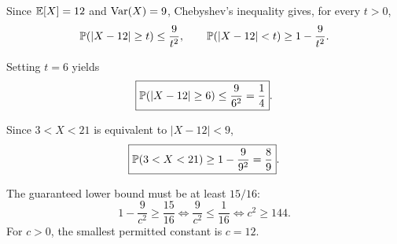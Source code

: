 \documentclass[11pt,oneside]{article}
\begin{document}
\begin{solution}
Since $\mathbb{E}[X]=12$ and $\operatorname{Var}(X)=9$, Chebyshev's inequality gives, for every $t>0$,
\[
\mathbb{P}(|X-12|\ge t)\le\frac9{t^2},\qquad
\mathbb{P}(|X-12|<t)\ge1-\frac9{t^2}.
\]
\begin{problemsubparts}
\item Setting $t=6$ yields
\[
\boxed{\mathbb{P}(|X-12|\ge6)\le\frac9{6^2}=\frac14}.
\]
\item Since $3<X<21$ is equivalent to $|X-12|<9$,
\[
\boxed{\mathbb{P}(3<X<21)\ge1-\frac9{9^2}=\frac89}.
\]
\item The guaranteed lower bound must be at least $15/16$:
\[
1-\frac9{c^2}\ge\frac{15}{16}
\iff \frac9{c^2}\le\frac1{16}
\iff c^2\ge144.
\]
For $c>0$, the smallest permitted constant is $\boxed{c=12}$.
\end{problemsubparts}
\end{solution}
\end{document}
